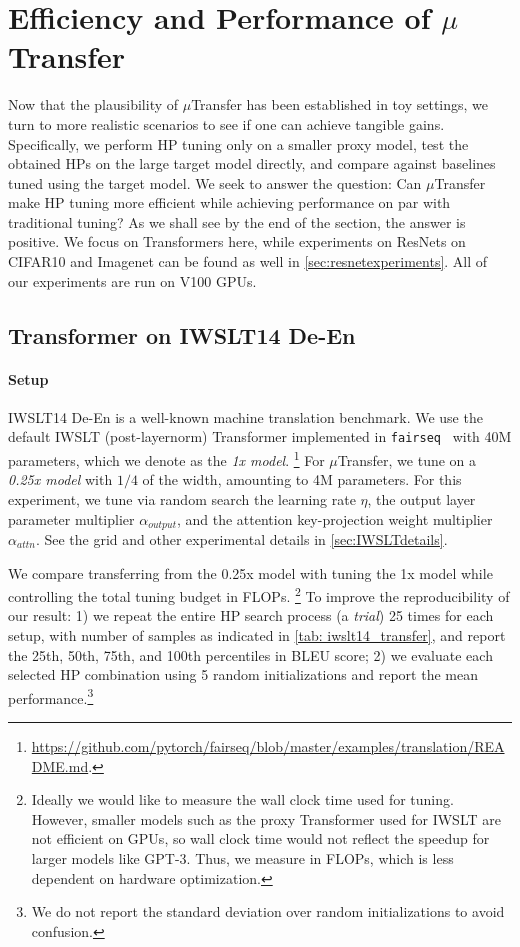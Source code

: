 \documentclass{article}
\theoremstyle{definition}
\begin{document}
\section{Efficiency and Performance of \texorpdfstring{$\mu$}{mu}Transfer}
\label{sec:transfermainresults}

Now that the plausibility of $\mu$Transfer has been established in toy settings, we turn to more realistic scenarios to see if one can achieve tangible gains.
Specifically, we perform HP tuning only on a smaller proxy model, test the obtained HPs on the large target model directly, and compare against baselines tuned using the target model.
We seek to answer the question: Can $\mu$Transfer make HP tuning more efficient while achieving performance on par with traditional tuning? 
As we shall see by the end of the section, the answer is positive.
We focus on Transformers here, while experiments on ResNets on CIFAR10 and Imagenet can be found as well in \cref{sec:resnetexperiments}.
All of our experiments are run on V100 GPUs.

\subsection{Transformer on IWSLT14 De-En}

\paragraph{Setup}
IWSLT14 De-En is a well-known machine translation benchmark.
We use the default IWSLT (post-layernorm) Transformer implemented in \texttt{fairseq}~\citep{ott2019fairseq} with 40M parameters, which we denote as the \emph{1x model}.
\footnote{\url{https://github.com/pytorch/fairseq/blob/master/examples/translation/README.md}.}
For $\mu$Transfer, we tune on a \emph{0.25x model} with $1/4$ of the width, amounting to 4M parameters.
For this experiment, we tune via random search the learning rate $\eta$, the output layer parameter multiplier $\alpha_{output}$, and the attention key-projection weight multiplier $\alpha_{attn}$.
See the grid and other experimental details in \cref{sec:IWSLTdetails}.

We compare transferring from the 0.25x model with tuning the 1x model while controlling the total tuning budget in FLOPs.
\footnote{Ideally we would like to measure the wall clock time used for tuning.
However, smaller models such as the proxy Transformer used for IWSLT are not efficient on GPUs, so wall clock time would not reflect the speedup for larger models like GPT-3.
Thus, we measure in FLOPs, which is less dependent on hardware optimization.}
To improve the reproducibility of our result: 1) we repeat the entire HP search process (a \emph{trial}) 25 times for each setup, with number of samples as indicated in \cref{tab: iwslt14_transfer}, and report the 25th, 50th, 75th, and 100th percentiles in BLEU score; 2) we evaluate each selected HP combination using 5 random initializations and report the mean performance.\footnote{We do not report the standard deviation over random initializations to avoid confusion.}
\end{document}
